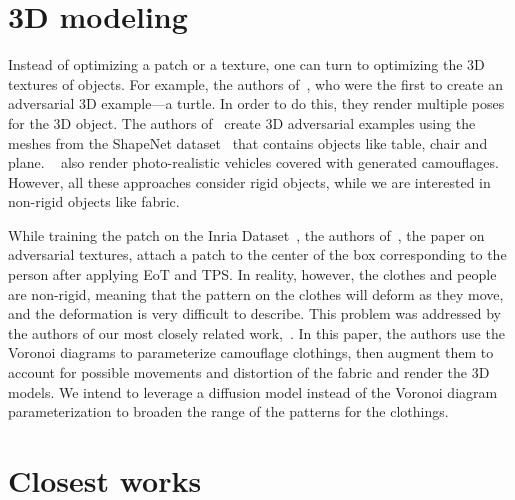 
\section{3D modeling}
Instead of optimizing a patch or a texture, one can turn to optimizing the 3D textures of objects.
For example, the authors of~\cite{eot}, who were the first to create an adversarial 3D example---a turtle.
In order to do this, they render multiple poses for the 3D object.
The authors of~\cite{unavailable_guys} create 3D adversarial examples using the meshes from the ShapeNet dataset~\cite{shapenet} that contains objects like table, chair and plane.
~\cite{fca, car_camo, dta, wang2021dual} also render photo-realistic vehicles covered with generated camouflages.
However, all these approaches consider rigid objects, while we are interested in non-rigid objects like fabric.

While training the patch on the Inria Dataset~\cite{inria}, the authors of~\cite{texture}, the paper on adversarial textures, attach a patch to the center of the box corresponding to the person after applying EoT and TPS.
In reality, however, the clothes and people are non-rigid, meaning that the pattern on the clothes will deform as they move, and the deformation is very difficult to describe.
This problem was addressed by the authors of our most closely related work,~\cite{zh_3d}.
In this paper, the authors use the Voronoi diagrams to parameterize camouflage clothings, then augment them to account for possible movements and distortion of the fabric and render the 3D models.
We intend to leverage a diffusion model instead of the Voronoi diagram parameterization to broaden the range of the patterns for the clothings.

\section{Closest works}

